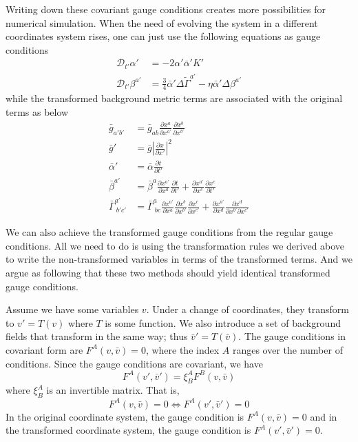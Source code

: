 \documentclass[letterpaper,nofootinbib,prd,amsmath,onecolumn]{revtex4-1}
\begin{document}
Writing down these covariant gauge conditions creates more possibilities for numerical simulation. When the need of evolving the system in a different coordinates system rises, one can just use the following equations as gauge conditions
\begin{align*}
\mathscr{D}_{t'}\alpha' & = -2\alpha'{\bar \alpha}'K'\\
\mathscr{D}_{t'}\beta^{a'} & = \frac{3}{4}{\bar \alpha}'\Delta {\tilde \Gamma}^{a'} - \eta {\bar \alpha}'\Delta\beta^{a'}
\end{align*}
while the transformed background metric terms are associated with the original terms as below
\begin{align}
{\bar g}_{a'b'} & = {\bar g}_{ab}\frac{\partial x^{a}}{\partial x^{a'}}\frac{\partial x^{b}}{\partial x^{b'}}\\
{\bar g'} & = {\bar g}\left|\frac{\partial x}{\partial x'}\right|^{2}\\
{\bar \alpha}' & = {\bar \alpha}\frac{\partial t}{\partial t'}\\
{\bar \beta}^{a'} & = {\bar \beta}^{a}\frac{\partial x^{a'}}{\partial x^{a}}\frac{\partial t}{\partial t'} + \frac{\partial x^{a'}}{\partial x^{c}}\frac{\partial x^{c}}{\partial t'}\label{background shift}\\
{\bar \Gamma}^{a'}_{~b'c'} & = {\bar \Gamma}^{a}_{~bc}\frac{\partial x^{a'}}{\partial x^{a}}\frac{\partial x^{b}}{\partial x^{b'}}\frac{\partial x^{c}}{\partial x^{c'}} + \frac{\partial x^{a'}}{\partial x^{d}}\frac{\partial x^{d}}{\partial x^{b'}\partial x^{c'}}
\end{align}

We can also achieve the transformed gauge conditions from the regular gauge conditions. All we need to do is using the transformation rules we derived above to write the non-transformed variables in terms of the transformed terms. And we argue as following that these two methods should yield identical transformed gauge conditions. 

Assume we have some variables $v$. Under a change of coordinates, they transform to $v' = T\left(v\right)$ where $T$ is some function. We also introduce a 
set of background fields that transform in the same way; thus $\bar v' = T\left(\bar v\right)$. The gauge conditions in covariant form are $F^A\left(v,\bar v\right) = 0$, 
where the index $A$ ranges over the number of conditions. Since the gauge conditions are covariant, we have 
\begin{equation}
	F^A\left(v',\bar v'\right) = \xi^A_B F^B\left(v,\bar v\right)
\end{equation}
where $\xi^A_B$ is an invertible matrix. That is, 
\begin{equation}\label{covariant equivalence}
	 F^A\left(v,\bar v\right) = 0 \Longleftrightarrow F^A\left(v',\bar v'\right) = 0
\end{equation}
In the original coordinate system, the gauge condition is $F^A\left(v,\bar v\right) = 0$ and in the transformed coordinate system, the 
gauge condition is $F^A\left(v',\bar v'\right) = 0$.
\end{document}

